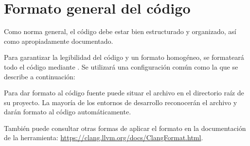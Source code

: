 \section{Formato general del código}

Como norma general, el código debe estar bien estructurado y organizado, así
como apropiadamente documentado.

Para garantizar la legibilidad del código y un formato homogéneo, se
formateará todo el código mediante . Se utilizará una
configuración común como la que se describe a continuación:



Para dar formato al código fuente puede situar el archivo
 en el directorio raíz de su proyecto. La mayoría de los
entornos de desarrollo reconocerán el archivo y darán formato al código
automáticamente.

También puede consultar otras formas de aplicar el formato en la documentación
de la herramienta:
\url{https://clang.llvm.org/docs/ClangFormat.html}.
